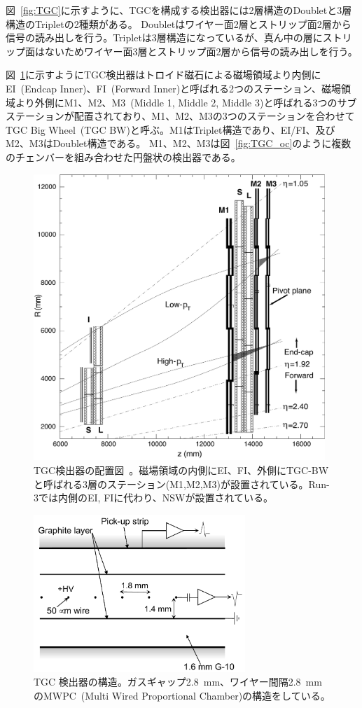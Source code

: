 図~\ref{fig:TGC}に示すように、TGCを構成する検出器には2層構造のDoubletと3層構造のTripletの2種類がある。
Doubletはワイヤー面2層とストリップ面2層から信号の読み出しを行う。Tripletは3層構造になっているが、真ん中の層にストリップ面はないためワイヤー面3層とストリップ面2層から信号の読み出しを行う。

図~\ref{fig:TGC_st}に示すようにTGC検出器はトロイド磁石による磁場領域より内側にEI~(Endcap Inner)、FI~(Forward Inner)と呼ばれる2つのステーション、磁場領域より外側にM1、M2、M3~(Middle 1, Middle 2, Middle 3)と呼ばれる3つのサブステーションが配置されており、M1、M2、M3の3つのステーションを合わせてTGC Big Wheel~(TGC BW)と呼ぶ。M1はTriplet構造であり、EI/FI、及びM2、M3はDoublet構造である。
M1、M2、M3は図~\ref{fig:TGC_oc}のように複数のチェンバーを組み合わせた円盤状の検出器である。
\begin{figure}[tb]
  \centering
  \includegraphics[clip, width=11cm]{fig/2/l1mue-schema.pdf}
  \caption{TGC検出器の配置図~\cite{Aad:1129811}。磁場領域の内側にEI、FI、外側にTGC-BWと呼ばれる3層のステーション(M1,M2,M3)が設置されている。Run-3では内側のEI,
  FIに代わり、NSWが設置されている。}
  \label{fig:TGC_st}
\end{figure}

\begin{figure}[tb]
  \centering
    \includegraphics[clip, width=8cm]{fig/2/TGC_anode_wire.pdf}
  \caption{TGC 検出器の構造\cite{Aad:1129811}。ガスギャップ2.8~mm、ワイヤー間隔2.8~mmのMWPC~(Multi
Wired Proportional Chamber)の構造をしている。}
  \label{fig:MWPC}
\end{figure}

